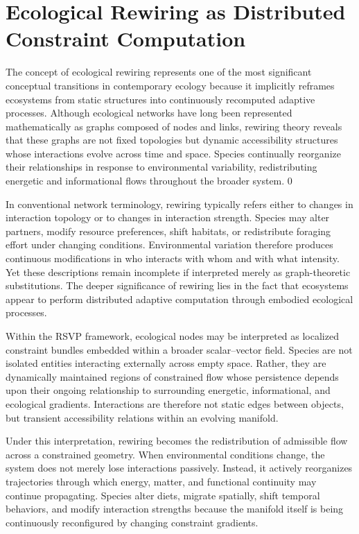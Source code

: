 \documentclass[11pt,a4paper]{article}
\begin{document}
\newpage

\section{Ecological Rewiring as Distributed Constraint Computation}

The concept of ecological rewiring represents one of the most significant conceptual transitions in contemporary ecology because it implicitly reframes ecosystems from static structures into continuously recomputed adaptive processes. Although ecological networks have long been represented mathematically as graphs composed of nodes and links, rewiring theory reveals that these graphs are not fixed topologies but dynamic accessibility structures whose interactions evolve across time and space. Species continually reorganize their relationships in response to environmental variability, redistributing energetic and informational flows throughout the broader system. 0

In conventional network terminology, rewiring typically refers either to changes in interaction topology or to changes in interaction strength. Species may alter partners, modify resource preferences, shift habitats, or redistribute foraging effort under changing conditions. Environmental variation therefore produces continuous modifications in who interacts with whom and with what intensity. Yet these descriptions remain incomplete if interpreted merely as graph-theoretic substitutions. The deeper significance of rewiring lies in the fact that ecosystems appear to perform distributed adaptive computation through embodied ecological processes.

Within the RSVP framework, ecological nodes may be interpreted as localized constraint bundles embedded within a broader scalar--vector field. Species are not isolated entities interacting externally across empty space. Rather, they are dynamically maintained regions of constrained flow whose persistence depends upon their ongoing relationship to surrounding energetic, informational, and ecological gradients. Interactions are therefore not static edges between objects, but transient accessibility relations within an evolving manifold.

Under this interpretation, rewiring becomes the redistribution of admissible flow across a constrained geometry. When environmental conditions change, the system does not merely lose interactions passively. Instead, it actively reorganizes trajectories through which energy, matter, and functional continuity may continue propagating. Species alter diets, migrate spatially, shift temporal behaviors, and modify interaction strengths because the manifold itself is being continuously reconfigured by changing constraint gradients.
\end{document}
